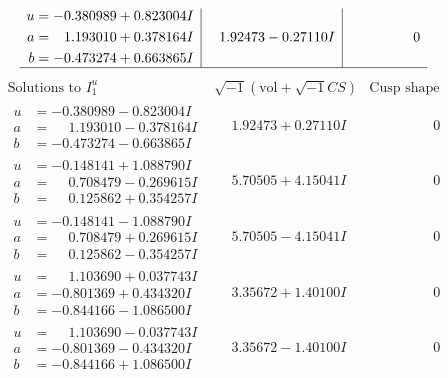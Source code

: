 \documentclass[1p]{elsarticle_modified}
\theoremstyle{definition}
\newcommand{\I}{\sqrt{-1}}
\begin{document}
$$\begin{array}{c|c|c}
\begin{aligned}
u &= -0.380989 + 0.823004 I \\
a &= \phantom{-}1.193010 + 0.378164 I \\
b &= -0.473274 + 0.663865 I\end{aligned}
 & \phantom{-}1.92473 - 0.27110 I & \phantom{-0.000000 } 0\\
 \hline 
 \end{array}$$\newpage$$\begin{array}{c|c|c}  
\text{Solutions to }I^u_{1}& \I (\text{vol} + \sqrt{-1}CS) & \text{Cusp shape}\\
 \hline 
\begin{aligned}
u &= -0.380989 - 0.823004 I \\
a &= \phantom{-}1.193010 - 0.378164 I \\
b &= -0.473274 - 0.663865 I\end{aligned}
 & \phantom{-}1.92473 + 0.27110 I & \phantom{-0.000000 } 0 \\ \hline\begin{aligned}
u &= -0.148141 + 1.088790 I \\
a &= \phantom{-}0.708479 - 0.269615 I \\
b &= \phantom{-}0.125862 + 0.354257 I\end{aligned}
 & \phantom{-}5.70505 + 4.15041 I & \phantom{-0.000000 } 0 \\ \hline\begin{aligned}
u &= -0.148141 - 1.088790 I \\
a &= \phantom{-}0.708479 + 0.269615 I \\
b &= \phantom{-}0.125862 - 0.354257 I\end{aligned}
 & \phantom{-}5.70505 - 4.15041 I & \phantom{-0.000000 } 0 \\ \hline\begin{aligned}
u &= \phantom{-}1.103690 + 0.037743 I \\
a &= -0.801369 + 0.434320 I \\
b &= -0.844166 - 1.086500 I\end{aligned}
 & \phantom{-}3.35672 + 1.40100 I & \phantom{-0.000000 } 0 \\ \hline\begin{aligned}
u &= \phantom{-}1.103690 - 0.037743 I \\
a &= -0.801369 - 0.434320 I \\
b &= -0.844166 + 1.086500 I\end{aligned}
 & \phantom{-}3.35672 - 1.40100 I & \phantom{-0.000000 } 0 \\ \hline\begin{aligned}

\end{aligned}
\end{array}$$
\end{document}
